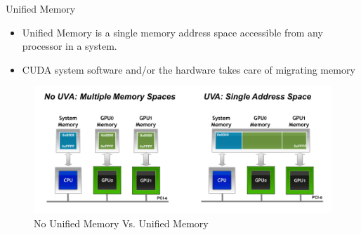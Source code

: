 \documentclass[
  english,            %
  aspectratio=169,    %
  11pt
]{tumbeamer}
\begin{document}
\begin{frame}{Unified Memory}
    \begin{itemize}
        \item Unified Memory is a single memory address space accessible from any processor in a system.
        \item CUDA system software and/or the hardware takes care of migrating memory
    \end{itemize}
    \begin{figure}
        \centering
        \includegraphics[width=.7\textwidth,height=.8\textheight,keepaspectratio=true]{figs/UnifiedMemoryCompare.png}
        \caption{No Unified Memory Vs. Unified Memory}
    \end{figure}
\end{frame}



\end{document}
